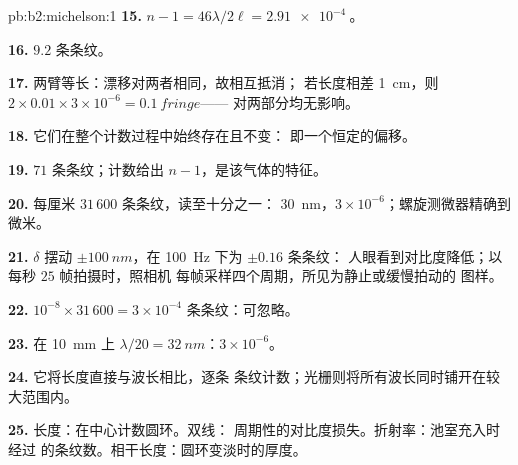\begin{solution}{pb:b2:michelson:1}
\textbf{15.} $n - 1 = 46\lambda/2\ell = \qty{2.91e-4}{}$。

\textbf{16.} $9.2$ 条条纹。

\textbf{17.} 两臂等长：漂移对两者相同，故相互抵消；
若长度相差 \qty{1}{cm}，则 $2 \times 0.01 \times 3 \times 10^{-6} = \qty{0.1}{fringe}$——
对两部分均无影响。

\textbf{18.} 它们在整个计数过程中始终存在且不变：
即一个恒定的偏移。

\textbf{19.} $71$ 条条纹；计数给出 $n - 1$，是该气体的特征。

\textbf{20.} 每厘米 $31\,600$ 条条纹，读至十分之一：
\qty{30}{nm}，$3 \times 10^{-6}$；螺旋测微器精确到微米。

\textbf{21.} $\delta$ 摆动 $\pm\qty{100}{nm}$，在 \qty{100}{Hz} 下为 $\pm0.16$ 条条纹：
人眼看到对比度降低；以每秒 $25$ 帧拍摄时，照相机
每帧采样四个周期，所见为静止或缓慢拍动的
图样。

\textbf{22.} $10^{-8} \times 31\,600 = 3 \times 10^{-4}$ 条条纹：可忽略。

\textbf{23.} 在 \qty{10}{mm} 上 $\lambda/20 = \qty{32}{nm}$：$3 \times 10^{-6}$。

\textbf{24.} 它将长度直接与波长相比，逐条
条纹计数；光栅则将所有波长同时铺开在较大范围内。

\textbf{25.} 长度：在中心计数圆环。双线：
周期性的对比度损失。折射率：池室充入时经过
的条纹数。相干长度：圆环变淡时的厚度。
\end{solution}
